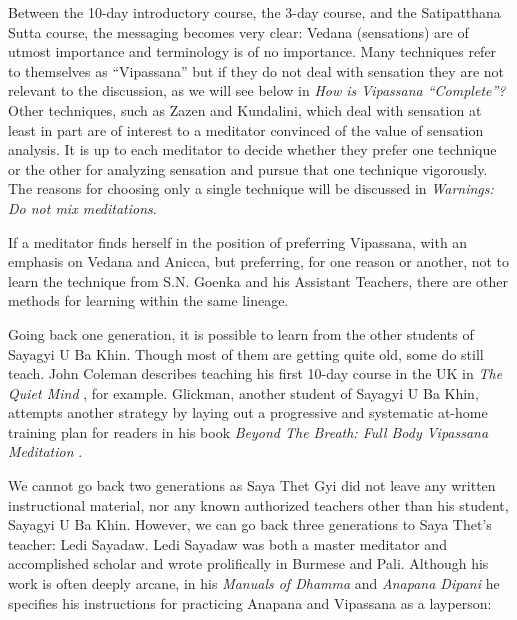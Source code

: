 \documentclass[a4paper, amsfonts, amssymb, amsmath, reprint, showkeys, nofootinbib, twoside]{revtex4-1}
\begin{document}
Between the 10-day introductory course, the 3-day course, and the Satipatthana Sutta
course, the messaging becomes very clear: Vedana (sensations) are of utmost
importance and terminology is of no importance. Many techniques refer to themselves
as ``Vipassana'' but if they do not deal with sensation they are not relevant to the
discussion, as we will see below in \textit{How is Vipassana ``Complete''?} Other
techniques, such as Zazen and Kundalini, which deal with sensation at least in part
are of interest to a meditator convinced of the value of sensation analysis. It is up
to each meditator to decide whether they prefer one technique or the other for
analyzing sensation and pursue that one technique vigorously. The reasons for
choosing only a single technique will be discussed in \textit{Warnings: Do not mix
  meditations}.

If a meditator finds herself in the position of preferring Vipassana, with an
emphasis on Vedana and Anicca, but preferring, for one reason or another, not to
learn the technique from S.N. Goenka and his Assistant Teachers, there are other
methods for learning within the same lineage.

Going back one generation, it is possible to learn from the other students of Sayagyi
U Ba Khin. Though most of them are getting quite old, some do still teach. John
Coleman describes teaching his first 10-day course in the UK in \textit{The Quiet
  Mind} , for example. Glickman, another student of Sayagyi U Ba Khin,
attempts another strategy by laying out a progressive and systematic at-home training
plan for readers in his book \textit{Beyond The Breath: Full Body Vipassana
  Meditation} .

We cannot go back two generations as Saya Thet Gyi did not leave any written
instructional material, nor any known authorized teachers other than his student,
Sayagyi U Ba Khin. However, we can go back three generations to Saya Thet's teacher:
Ledi Sayadaw. Ledi Sayadaw was both a master meditator and accomplished scholar and
wrote prolifically in Burmese and Pali. Although his work is often deeply arcane, in
his \textit{Manuals of Dhamma} and \textit{Anapana Dipani}  he
specifies his instructions for practicing Anapana and Vipassana as a layperson:
\end{document}
